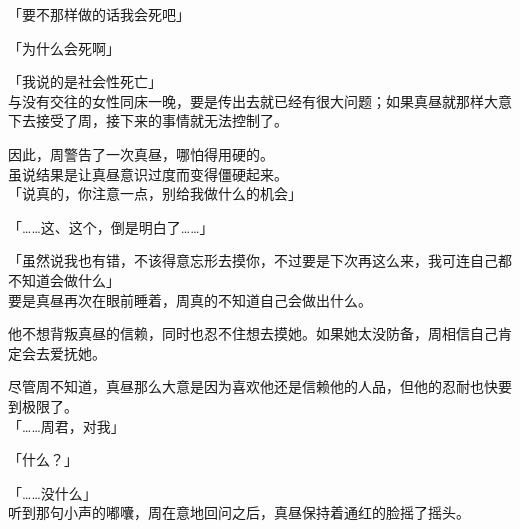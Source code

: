 「要不那样做的话我会死吧」

「为什么会死啊」

「我说的是社会性死亡」\\

与没有交往的女性同床一晚，要是传出去就已经有很大问题；如果真昼就那样大意下去接受了周，接下来的事情就无法控制了。

因此，周警告了一次真昼，哪怕得用硬的。\\

虽说结果是让真昼意识过度而变得僵硬起来。\\

「说真的，你注意一点，别给我做什么的机会」

「……这、这个，倒是明白了……」

「虽然说我也有错，不该得意忘形去摸你，不过要是下次再这么来，我可连自己都不知道会做什么」\\

要是真昼再次在眼前睡着，周真的不知道自己会做出什么。

他不想背叛真昼的信赖，同时也忍不住想去摸她。如果她太没防备，周相信自己肯定会去爱抚她。

尽管周不知道，真昼那么大意是因为喜欢他还是信赖他的人品，但他的忍耐也快要到极限了。\\

「……周君，对我」

「什么？」

「……没什么」\\

听到那句小声的嘟囔，周在意地回问之后，真昼保持着通红的脸摇了摇头。
